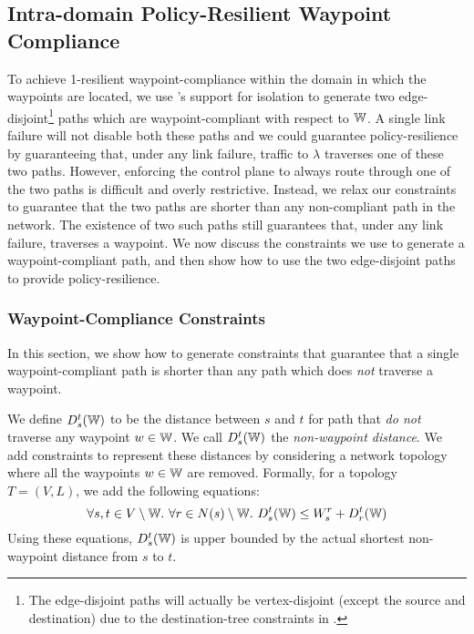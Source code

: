 \subsection{Intra-domain Policy-Resilient Waypoint Compliance}\label{sec:ospfwaypoint}
To achieve 1-resilient waypoint-compliance within the domain
in which the waypoints are located, we use \genesis's
support for isolation to generate two edge-disjoint\footnote
{The edge-disjoint paths will actually be vertex-disjoint (except the 
	source and destination) due to the destination-tree constraints
	in \genesis.} paths
which are waypoint-compliant with respect to $\mathbb{W}$. A single link
failure will not disable both these paths
and we could guarantee policy-resilience by 
guaranteeing that, under any link failure,
traffic to $\lambda$ 
traverses one of these two paths. However, enforcing the control plane to 
always route through one of the two paths is difficult and overly 
restrictive. 
Instead, we relax our constraints to guarantee that
the two paths are shorter than any non-compliant path in 
the network. The existence of two such paths still guarantees that,
under any link failure,
 traverses a waypoint. 
We now discuss the
constraints we use to generate 
a waypoint-compliant path, and then show
how to use the two edge-disjoint 
paths to provide policy-resilience. 


\subsubsection{Waypoint-Compliance Constraints}
In this section, we show how to generate constraints that
guarantee that a single waypoint-compliant path is shorter
than any path which does \emph{not} traverse a waypoint. 

We define $D_s^t(\mathbb{W})$ to be the 
distance between $s$ and $t$ for path that \emph{do not}
 traverse any waypoint $w \in \mathbb{W}$.
We call  $D_s^t(\mathbb{W})$ the \emph{non-waypoint distance}.
  We
   add constraints to represent these distances by
  considering a network topology where all the  
  waypoints $w \in \mathbb{W}$ are removed. Formally, for a topology 
 $T = (V,L)$, we add the following equations:
\begin{equation} \label{eq:wdistance}
\forall s, t \in V \setminus \mathbb{W}. ~\forall r \in N(s) \setminus \mathbb{W}.~
D_s^t(\mathbb{W}) \leq W_s^r + D_r^t(\mathbb{W})
\end{equation}
Using these equations,
$D_s^t(\mathbb{W})$ is upper bounded by the actual shortest non-waypoint distance from $s$ to $t$.

